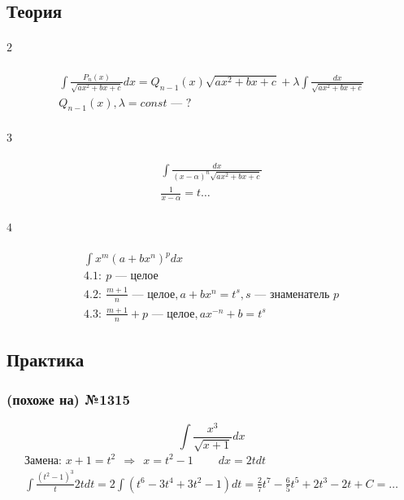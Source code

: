 \documentclass{article}
\begin{document}
\subsection{Теория}
\paragraph{$\boxed{2}$}
\begin{gather*}
    \int \frac{P_n(x)}{\sqrt{ax^2 + bx + c}} dx = 
    Q_{n - 1}(x) \sqrt{ax^2 + bx + c} + \lambda \int \frac{dx}{\sqrt{ax^2 + bx + c}} \\
    Q_{n - 1}(x), \lambda = const \text{ --- } ? 
\end{gather*}
\paragraph{$\boxed{3}$}
\begin{gather*}
    \int \frac{dx}{(x - \alpha)^n \sqrt{ax^2 + bx + c}} \\
    \frac{1}{x - \alpha} = t \dots
\end{gather*}
\paragraph{$\boxed{4}$}
\begin{gather*}
    \int x^m \left(a + bx^n\right)^p dx \\
    \boxed{4.1}:~ p \text{ --- целое} \\
    \boxed{4.2}:~ \frac{m + 1}{n} \text{ --- целое}, a + bx^n = t^s, s \text{ --- знаменатель } p \\
    \boxed{4.3}:~ \frac{m + 1}{n} + p \text{ --- целое}, ax^{-n} + b = t^s
\end{gather*}


\subsection{Практика}

\subsubsection{(похоже на) №1315}
\[
    \int \frac{x^3}{\sqrt{x + 1}} dx
\]  
\begin{gather*}
    \text{Замена: } x + 1 = t^2 ~~\Rightarrow~~ x = t^2 - 1 ~~~~~~~~~~ dx = 2tdt \\
    \int \frac{(t^2 - 1)^3}{t} 2tdt =
    2 \int \left(t^6 - 3t^4 + 3t^2 - 1\right) dt =
    \frac{2}{7}t^7 - \frac{6}{5}t^5 + 2t^3 - 2t + C = \dots
\end{gather*}
\end{document}
